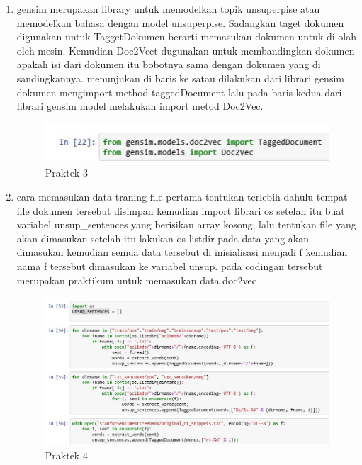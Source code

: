 \begin{enumerate}
\item gensim merupakan library untuk memodelkan topik unsuperpise atau memodelkan bahasa dengan model unsuperpise. Sadangkan taget dokumen digunakan untuk TaggetDokumen berarti memasukan dokumen untuk di olah oleh mesin. Kemudian Doc2Vect dugunakan untuk membandingkan dokumen apakah isi dari dokumen itu bobotnya sama dengan dokumen yang di sandingkannya. menunjukan di baris ke satau dilakukan dari librari gensim dokumen mengimport method taggedDocument lalu pada baris kedua dari librari gensim model melakukan import metod Doc2Vec.

\begin{figure}[ht]
\centering
\includegraphics[scale=0.6]{figures/1174008/5/2,3.PNG}
\caption{Praktek 3}
\end{figure}

\item cara memasukan data traning file pertama tentukan terlebih dahulu tempat file dokumen tersebut disimpan kemudian import librari os setelah itu buat variabel unsup\_sentences yang berisikan array kosong, lalu tentukan file yang akan dimasukan setelah itu lakukan os listdir pada data yang akan dimasukan kemudian semua data tersebut di inisialisasi menjadi f kemudian nama f tersebut dimasukan ke variabel unsup. pada codingan tersebut merupakan praktikum untuk memasukan data doc2vec\par

\begin{figure}[ht]
\centering
\includegraphics[scale=0.6]{figures/1174008/5/2,4.PNG}
\caption{Praktek 4}
\end{figure}


\end{enumerate}
